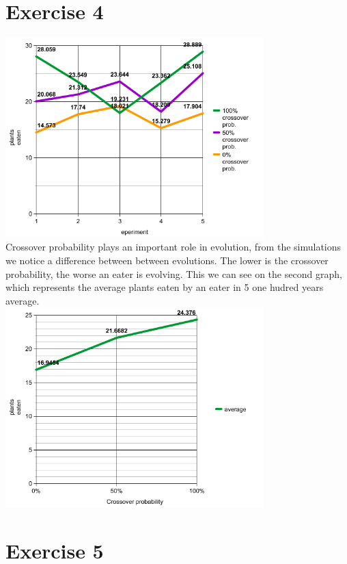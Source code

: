 \documentclass[a4paper,10pt]{article}
\begin{document}
\section*{Exercise 4}
\includegraphics[width=10cm]{graph.png}\\
Crossover probability plays an important role in evolution, from the simulations we notice a difference between
between evolutions. The lower is the crossover probability, the worse an eater is evolving. This we can see on
the second graph, which represents the average plants eaten by an eater in 5 one hudred years average.\\
\includegraphics[width=10cm]{graph4.png}\\

\section*{Exercise 5}
\end{document}
